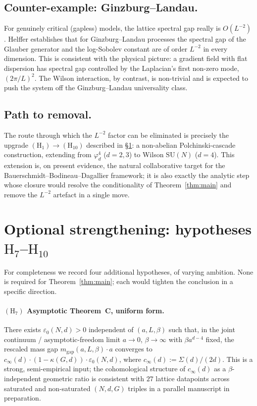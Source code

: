 \documentclass[11pt,reqno]{amsart}
\theoremstyle{plain}
\theoremstyle{definition}
\theoremstyle{remark}
\newcommand{\SUN}{\mathrm{SU}(N)}
\begin{document}
\subsection{Counter-example: Ginzburg--Landau.}
For genuinely critical (gapless) models, the lattice spectral gap really is $O(L^{-2})$. Helffer \cite{Helffer1999} establishes that for Ginzburg--Landau processes the spectral gap of the Glauber generator and the log-Sobolev constant are of order $L^{-2}$ in every dimension. This is consistent with the physical picture: a gradient field with flat dispersion has spectral gap controlled by the Laplacian's first non-zero mode, $(2\pi/L)^2$. The Wilson interaction, by contrast, is non-trivial and is expected to push the system off the Ginzburg--Landau universality class.

\subsection{Path to removal.}
The route through which the $L^{-2}$ factor can be eliminated is precisely the upgrade $(\mathrm{H}_1) \to (\mathrm{H}_{10})$ described in \S\ref{sec:optional-strengthening}: a non-abelian Polchinski-cascade construction, extending \cite{BD22, BBD24} from $\varphi^4_d$ ($d = 2, 3$) to Wilson $\SUN$ ($d = 4$). This extension is, on present evidence, the natural collaborative target for the Bauerschmidt--Bodineau--Dagallier framework; it is also exactly the analytic step whose closure would resolve the conditionality of Theorem~\ref{thm:main} and remove the $L^{-2}$ artefact in a single move.

\section{Optional strengthening: hypotheses $\mathrm{H}_7$--$\mathrm{H}_{10}$}
\label{sec:optional-strengthening}

For completeness we record four additional hypotheses, of varying ambition. None is required for Theorem~\ref{thm:main}; each would tighten the conclusion in a specific direction.

\paragraph{$(\mathrm{H}_7)$ Asymptotic Theorem~C, uniform form.}
There exists $\varepsilon_0(N, d) > 0$ independent of $(a, L, \beta)$ such that, in the joint continuum / asymptotic-freedom limit $a \to 0$, $\beta \to \infty$ with $\beta a^{d - 4}$ fixed, the rescaled mass gap $m_{\mathrm{gap}}(a, L, \beta) \cdot a$ converges to $c_\infty(d) \cdot (1 - \kappa(G, d)) \cdot \varepsilon_0(N, d)$, where $c_\infty(d) := \Sigma(d) / (2d)$. This is a strong, semi-empirical input; the cohomological structure of $c_\infty(d)$ as a $\beta$-independent geometric ratio is consistent with $27$ lattice datapoints across saturated and non-saturated $(N, d, G)$ triples in a parallel manuscript in preparation.
\end{document}
